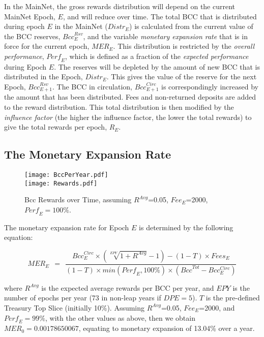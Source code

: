 \documentclass[11pt,a4paper,dvipsnames,twosided,final]{article}
\newcommand{\bcc}{BCC{}}
\newcommand{\bcc}[1]{Bcc}
\begin{document}
\noindent
In the MainNet, the gross rewards distribution will depend on the current MainNet Epoch, $E$, and will reduce over time.
The total \bcc{} that is distributed during epoch $E$ in the MainNet (${\textit{Distr}}_E$) is calculated from the current
value of the \bcc{} reserves, $\textit{Bcc}^{\textit{Rsv}}_E$, and the variable \emph{monetary expansion rate} that is in force for
the current epoch, $\textit{MER}_E$.
%
This distribution is restricted by the \emph{overall performance}, $\textit{Perf}_E$, which is defined as a fraction of the \emph{expected performance} during Epoch $E$.
%
The reserves will be depleted by the amount of new \bcc{} that is distributed in the Epoch, $\textit{Distr}_E$. This gives the
value of the reserve for the next Epoch, $\textit{Bcc}^{\textit{Rsv}}_{E+1}$.  The \bcc{} in circulation, $\textit{Bcc}^{\textit{Circ}}_{E+1}$
is correspondingly increased by the amount that has been distributed.
%
Fees and non-returned deposits are added to the reward distribution.  This total distribution is then modified by the \emph{influence factor}
(the higher the influence factor, the lower the total rewards) to give the total rewards per epoch, $R_E$.

\subsection{The Monetary Expansion Rate}
\label{sec:expansion}

\begin{figure}[h!]
  \begin{center}
    \texttt{[image: BccPerYear.pdf]}
\\[2ex]
    \texttt{[image: Rewards.pdf]}
  \end{center}
  \caption{Bcc Rewards over Time, assuming $R^{\textit{Avg}}$=0.05, $\textit{Fee}_E$=2000, $\textit{Perf}_E=100\%$.}
\end{figure}

\noindent
The monetary expansion rate for Epoch $E$ is determined by the following equation:

$$
\textit{MER}_E ~~=~~ \frac{\textit{Bcc}^{Circ}_E \times (\sqrt[\textit{EPY}]{1+R^{\textit{Avg}}} - 1) - (1- T) \times \textit{Fees}_E}
                          {(1-T) \times \textit{min}(\textit{Perf}_E,100\%) \times (\textit{Bcc}^{Tot} - Bcc^{Circ}_E)}
$$

\noindent
where $R^{\textit{Avg}}$ is the expected average rewards per \bcc{} per year, and $\textit{EPY}$ is the number of epochs per year (73 in non-leap years if
$\textit{DPE} = 5$). $T$ is the pre-defined Treasury Top Slice (initially 10\%).
%
Assuming $R^{\textit{Avg}}$=0.05, $\textit{Fee}_E$=2000, and $\textit{Perf}_E=99\%$, with the other values as above, then we obtain
$\textit{MER}_0 = 0.00178650067$, equating to monetary expansion of 13.04\% over a year.
\end{document}
